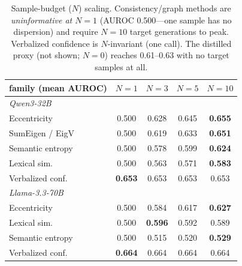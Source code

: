 \documentclass[11pt]{article}
\newcommand{\best}[1]{\textbf{#1}}
\begin{document}
\begin{table}[t]\centering\small
\setlength{\tabcolsep}{4pt}
\begin{tabular}{l cccc}
\toprule
family (mean AUROC) & $N{=}1$ & $N{=}3$ & $N{=}5$ & $N{=}10$\\
\midrule
\multicolumn{5}{l}{\emph{Qwen3-32B}}\\
Eccentricity      & 0.500 & 0.628 & 0.645 & \best{0.655}\\
SumEigen / EigV   & 0.500 & 0.619 & 0.633 & \best{0.651}\\
Semantic entropy  & 0.500 & 0.578 & 0.599 & \best{0.624}\\
Lexical sim.      & 0.500 & 0.563 & 0.571 & \best{0.583}\\
Verbalized conf.  & \best{0.653} & 0.653 & 0.653 & 0.653\\
\midrule
\multicolumn{5}{l}{\emph{Llama-3.3-70B}}\\
Eccentricity      & 0.500 & 0.584 & 0.617 & \best{0.627}\\
Lexical sim.      & 0.500 & \best{0.596} & 0.592 & 0.589\\
Semantic entropy  & 0.500 & 0.515 & 0.520 & \best{0.529}\\
Verbalized conf.  & \best{0.664} & 0.664 & 0.664 & 0.664\\
\bottomrule
\end{tabular}
\caption{Sample-budget ($N$) scaling. Consistency/graph methods are \emph{uninformative
at $N{=}1$} (AUROC 0.500---one sample has no dispersion) and require $N{=}10$ target
generations to peak. Verbalized confidence is $N$-invariant (one call). The distilled
proxy (not shown; $N{=}0$) reaches 0.61--0.63 with no target samples at all.}
\label{tab:nsweep}
\end{table}
\end{document}
